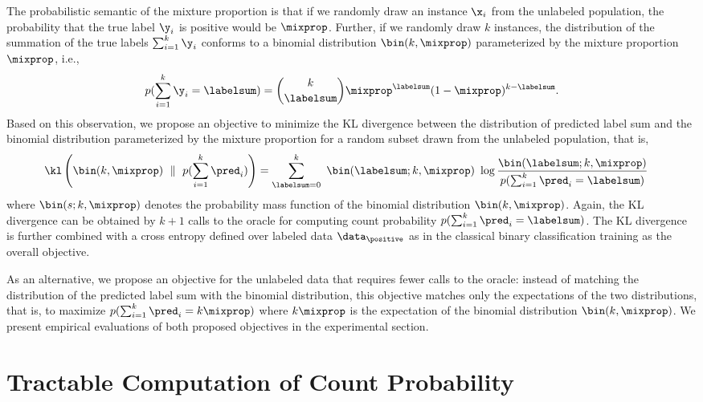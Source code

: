 \documentclass{article}
\begin{document}
The probabilistic semantic of the mixture proportion is that if we randomly draw an instance $\x_i$ from the unlabeled population, 
the probability that the true label $\y_i$ is positive would be $\mixprop$.
Further, if we randomly draw $k$ instances, 
the distribution of the summation of the true labels $\sum_{i = 1}^k \y_i$ conforms to a binomial distribution $\bin(k, \mixprop)$ parameterized by the mixture proportion $\mixprop$, i.e.,
\begin{equation}
    p(\sum_{i = 1}^k \y_i = \labelsum)
    = \binom{k}{\labelsum} \mixprop^{\labelsum} (1 - \mixprop)^{k - \labelsum}.
\end{equation}
Based on this observation, we propose an objective to minimize the KL divergence between the distribution of predicted label sum and the binomial distribution parameterized by the mixture proportion for a random subset drawn from the unlabeled population, that is,
\begin{equation*}
\begin{split}
    &\kl\left(\bin(k, \mixprop)~\parallel~p(\sum_{i = 1}^k \pred_i) \right) = \sum_{\labelsum = 0}^{k}~\bin(\labelsum; k, \mixprop)~\log \frac{\bin(\labelsum; k, \mixprop)}{p(\sum_{i = 1}^k \pred_i = \labelsum)}
\end{split}
\end{equation*}
where $\bin(s; k, \mixprop)$ denotes the probability mass function of the binomial distribution $\bin(k, \mixprop)$.
Again, the KL divergence can be obtained by $k + 1$ calls to the oracle for computing count probability $p(\sum_{i = 1}^k \pred_i = \labelsum)$.
The KL divergence is further combined with a cross entropy defined over labeled data $\data_{\positive}$ as in the classical binary classification training as the overall objective.

As an alternative, we propose an objective for the unlabeled data that requires fewer calls to the oracle: instead of matching the distribution of the predicted label sum with the binomial distribution, this objective matches only the expectations of the two distributions, that is, to maximize $p(\sum_{i = 1}^k \pred_i = k\mixprop)$ where $k\mixprop$ is the expectation of the binomial distribution $\bin(k, \mixprop)$. We present empirical evaluations of both proposed objectives in the experimental section.



\section{Tractable Computation of Count Probability}
\end{document}
